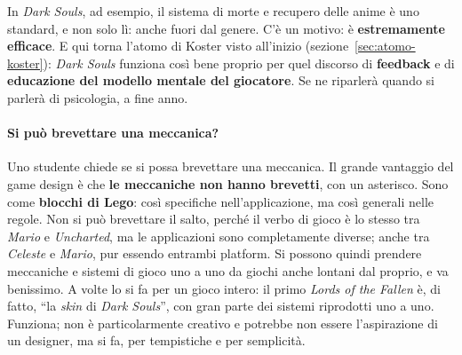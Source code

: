 In \emph{Dark Souls}, ad esempio, il sistema di morte e recupero delle anime
è uno standard, e non solo lì: anche fuori dal genere. C'è un motivo: è
\textbf{estremamente efficace}. E qui torna l'atomo di Koster visto
all'inizio (sezione~\ref{sec:atomo-koster}): \emph{Dark Souls} funziona così
bene proprio per quel discorso di \textbf{feedback} e di \textbf{educazione
del modello mentale del giocatore}. Se ne riparlerà quando si parlerà di
psicologia, a fine anno.

\paragraph{Si può brevettare una meccanica?} Uno studente chiede se si possa
brevettare una meccanica. Il grande vantaggio del game design è che
\textbf{le meccaniche non hanno brevetti}, con un asterisco. Sono come
\textbf{blocchi di Lego}: così specifiche nell'applicazione, ma così generali
nelle regole. Non si può brevettare il salto, perché il verbo di gioco è lo
stesso tra \emph{Mario} e \emph{Uncharted}, ma le applicazioni sono
completamente diverse; anche tra \emph{Celeste} e \emph{Mario}, pur essendo
entrambi platform. Si possono quindi prendere meccaniche e sistemi di gioco
uno a uno da giochi anche lontani dal proprio, e va benissimo. A volte lo si fa
per un gioco intero: il primo \emph{Lords of the Fallen} è, di fatto, ``la
\emph{skin} di \emph{Dark Souls}'', con gran parte dei sistemi riprodotti uno
a uno. Funziona; non è particolarmente creativo e potrebbe non essere
l'aspirazione di un designer, ma si fa, per tempistiche e per semplicità.

